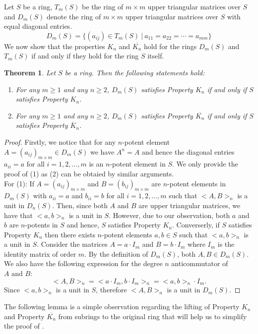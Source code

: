 \documentclass[12pt]{amsart}
\newtheorem{theorem}{Theorem}[section]
\theoremstyle{definition}
\newtheorem{eg}[theorem]{Example}
\numberwithin{equation}{section}
\begin{document}
Let $S$ be a ring, $T_m(S)$ be the ring of $m \times m$ upper triangular matrices over $S$ and $D_m(S)$ denote the ring of $m \times m$ upper triangular matrices over $S$ with equal diagonal entries. 
$$D_m(S)=\big\lbrace (a_{ij}) \in T_m(S)\  |\ a_{11} =a_{22} = \cdots = a_{mm} \big\rbrace $$
We now show that the properties $K_n$ and $\overline{K_n}$ hold for the rings $D_m(S)$ and $T_m(S)$ if and only if they hold for the ring $S$ itself. 
\begin{theorem}\label{THM: Property Kn for D_m(S)}
    Let $S$ be a ring. Then the following statements hold:
    \begin{enumerate}
        \item For any $m \geq 1$ and any $n \geq 2$, $D_m(S)$ satisfies Property $K_n$ if and only if $S$ satisfies Property $K_n$. 
        \item For any $m \geq 1$ and any $n \geq 2$, $D_m(S)$ satisfies Property $\overline{K_n}$ if and only if $S$ satisfies Property $\overline{K}_n$.  
    \end{enumerate}
   
\end{theorem}
\begin{proof}
Firstly, we notice that for any $n$-potent element $A=(a_{ij})_{m \times m} \in D_m(S)$ we have $A^n=A$ and hence the diagonal entries $a_{ii}=a$ for all $i=1,2,\dots,m$ is an $n$-potent element in $S$. We only provide the proof of (1) as (2) can be obtaied by similar arguments.\\
For (1): If $A=(a_{ij})_{m \times m}$ and $B=(b_{ij})_{m \times m}$ are $n$-potent elements in $D_m(S)$ with $a_{ii}=a$ and $b_{ii}=b$ for all $i=1,2,\dots,m$ such that $<A,B>_n$ is a unit in $D_n(S)$. Then, since both $A$
 and $B$ are upper triangular matrices, we have that $<a,b>_n$ is a unit in $S$. However, due to our observation, both $a$ and $b$ are $n$-potents in $S$ and hence, $S$ satisfies Property $K_n$. Converserly, if $S$ satisfies Property $K_n$ then there exists $n$-potent elements $a,b \in S$ such that $<a,b>_n$ is a unit in $S$. Consider the matrices $A=a\cdot I_m$ and $B=b\cdot I_m$ where $I_m$ is the identity matrix of order $m$. By the definition of $D_m(S)$, both $A,B \in D_m(S)$. We also have the following expression for the degree $n$ anticommutator of $A \text{ and }B$:
 $$<A,B>_n=<a\cdot I_m, b\cdot I_m>_n=<a,b>_n\cdot I_m.$$
Since $<a,b>_n$ is a unit in $S$, therefore $<A,B>_n$ is a unit in $D_m(S)$.
 \end{proof}
The following lemma is a simple observation regarding the lifting of Property $K_n$ and Property $\overline{K_n}$ from subrings to the original ring that will help us to simplify the proof of . 
\end{document}
